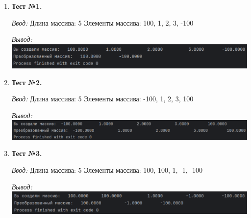 \documentclass[12pt]{article}
\begin{document}
\begin{enumerate}

\item \textbf{Тест №1.} 

\textit{Ввод:} 
Длина массива: 5
Элементы массива: 100, 1, 2, 3, -100

\textit{Вывод:} \includegraphics[width=1\textwidth]{img1}



\item \textbf{Тест №2.}

\textit{Ввод:}
Длина массива: 5
Элементы массива: -100, 1, 2, 3, 100

\textit{Вывод:} \includegraphics[width=1\textwidth]{img2}



\item \textbf{Тест №3.}

\textit{Ввод:}
Длина массива: 5
Элементы массива: 100, 100, 1, -1, -100

\textit{Вывод:} \includegraphics[width=1\textwidth]{img3}


\end{enumerate}
\end{document}
